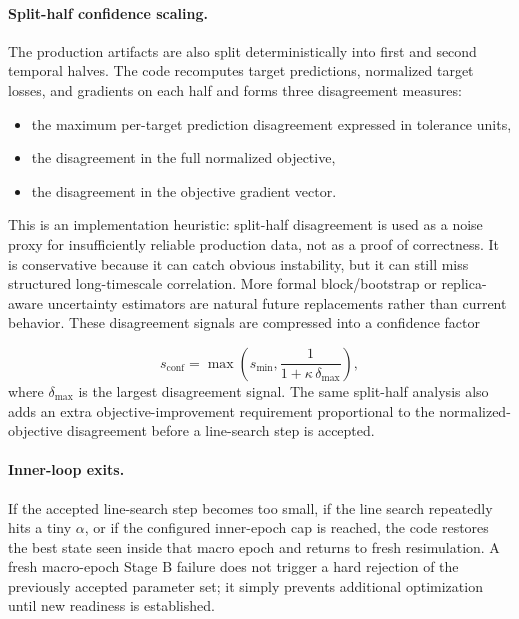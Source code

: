 \paragraph{Split-half confidence scaling.}
The production artifacts are also split deterministically into first and second temporal halves. The code recomputes target predictions, normalized target losses, and gradients on each half and forms three disagreement measures:

\begin{itemize}
    \item the maximum per-target prediction disagreement expressed in tolerance units,
    \item the disagreement in the full normalized objective,
    \item the disagreement in the objective gradient vector.
\end{itemize}

This is an implementation heuristic: split-half disagreement is used as a noise proxy for insufficiently reliable production data, not as a proof of correctness. It is conservative because it can catch obvious instability, but it can still miss structured long-timescale correlation. More formal block/bootstrap or replica-aware uncertainty estimators are natural future replacements rather than current behavior. These disagreement signals are compressed into a confidence factor

\begin{equation}
    s_{\mathrm{conf}}
    =
    \max
    \left(
        s_{\min},
        \frac{1}{1 + \kappa \, \delta_{\max}}
    \right),
\end{equation}
%
where $\delta_{\max}$ is the largest disagreement signal. The same split-half analysis also adds an extra objective-improvement requirement proportional to the normalized-objective disagreement before a line-search step is accepted.

\paragraph{Inner-loop exits.}

If the accepted line-search step becomes too small, if the line search repeatedly hits a tiny $\alpha$, or if the configured inner-epoch cap is reached, the code restores the best state seen inside that macro epoch and returns to fresh resimulation. A fresh macro-epoch Stage B failure does not trigger a hard rejection of the previously accepted parameter set; it simply prevents additional optimization until new readiness is established.


